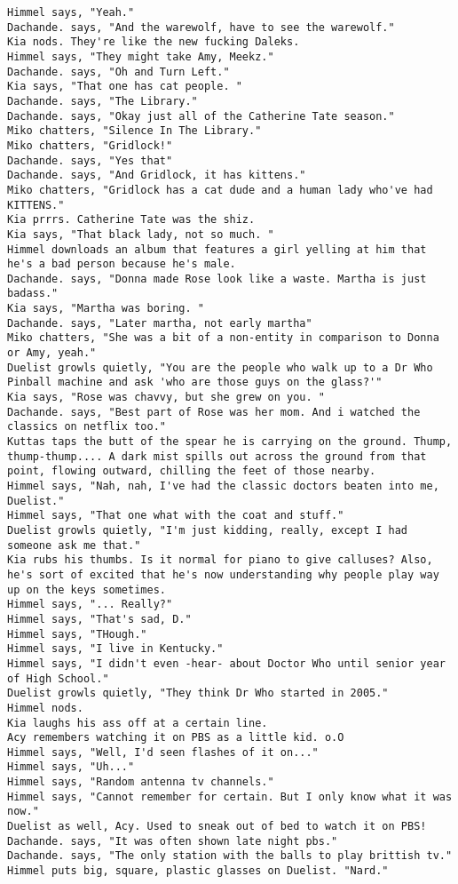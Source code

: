 \begin{verbatim}
Himmel says, "Yeah."
Dachande. says, "And the warewolf, have to see the warewolf."
Kia nods. They're like the new fucking Daleks.
Himmel says, "They might take Amy, Meekz."
Dachande. says, "Oh and Turn Left."
Kia says, "That one has cat people. "
Dachande. says, "The Library."
Dachande. says, "Okay just all of the Catherine Tate season."
Miko chatters, "Silence In The Library."
Miko chatters, "Gridlock!"
Dachande. says, "Yes that"
Dachande. says, "And Gridlock, it has kittens."
Miko chatters, "Gridlock has a cat dude and a human lady who've had KITTENS."
Kia prrrs. Catherine Tate was the shiz.
Kia says, "That black lady, not so much. "
Himmel downloads an album that features a girl yelling at him that he's a bad person because he's male.
Dachande. says, "Donna made Rose look like a waste. Martha is just badass."
Kia says, "Martha was boring. "
Dachande. says, "Later martha, not early martha"
Miko chatters, "She was a bit of a non-entity in comparison to Donna or Amy, yeah."
Duelist growls quietly, "You are the people who walk up to a Dr Who Pinball machine and ask 'who are those guys on the glass?'"
Kia says, "Rose was chavvy, but she grew on you. "
Dachande. says, "Best part of Rose was her mom. And i watched the classics on netflix too."
Kuttas taps the butt of the spear he is carrying on the ground. Thump, thump-thump.... A dark mist spills out across the ground from that point, flowing outward, chilling the feet of those nearby.
Himmel says, "Nah, nah, I've had the classic doctors beaten into me, Duelist."
Himmel says, "That one what with the coat and stuff."
Duelist growls quietly, "I'm just kidding, really, except I had someone ask me that."
Kia rubs his thumbs. Is it normal for piano to give calluses? Also, he's sort of excited that he's now understanding why people play way up on the keys sometimes.
Himmel says, "... Really?"
Himmel says, "That's sad, D."
Himmel says, "THough."
Himmel says, "I live in Kentucky."
Himmel says, "I didn't even -hear- about Doctor Who until senior year of High School."
Duelist growls quietly, "They think Dr Who started in 2005."
Himmel nods.
Kia laughs his ass off at a certain line.
Acy remembers watching it on PBS as a little kid. o.O
Himmel says, "Well, I'd seen flashes of it on..."
Himmel says, "Uh..."
Himmel says, "Random antenna tv channels."
Himmel says, "Cannot remember for certain. But I only know what it was now."
Duelist as well, Acy. Used to sneak out of bed to watch it on PBS!
Dachande. says, "It was often shown late night pbs."
Dachande. says, "The only station with the balls to play brittish tv."
Himmel puts big, square, plastic glasses on Duelist. "Nard."

\end{verbatim}

